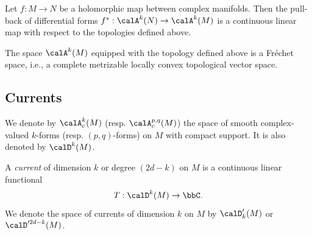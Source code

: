     \begin{proposition}\label{prop:pullback_of_forms_is_continuous}
        Let \(f: M \to N\) be a holomorphic map between complex manifolds.
        Then the pull-back of differential forms \(f^*: \calA^{k}(N) \to \calA^{k}(M)\) is a continuous linear map with respect to the topologies defined above.
    \end{proposition}

    \begin{proposition}\label{prop:A^k_is_Fr\'echet_space}
        The space \(\calA^{k}(M)\) equipped with the topology defined above is a Fr\'echet space,
        i.e., a complete metrizable locally convex topological vector space.
    \end{proposition}


\subsection{Currents}

    We denote by \(\calA_c^{k}(M)\) (resp. \(\calA_c^{p,q}(M)\)) the space of smooth complex-valued \(k\)-forms (resp. \((p,q)\)-forms) on \(M\) with compact support.
    It is also denoted by \(\calD^{k}(M)\).

    \begin{definition}\label{def:currents}
        A \emph{current} of dimension \(k\) or degree \((2d - k)\) on \(M\) is a continuous linear functional
        \[ T: \calD^k(M) \to \bbC. \]
        We denote the space of currents of dimension \(k\) on \(M\) by \(\calD_k'(M)\) or \(\calD'^{2d-k}(M)\).
    \end{definition}
